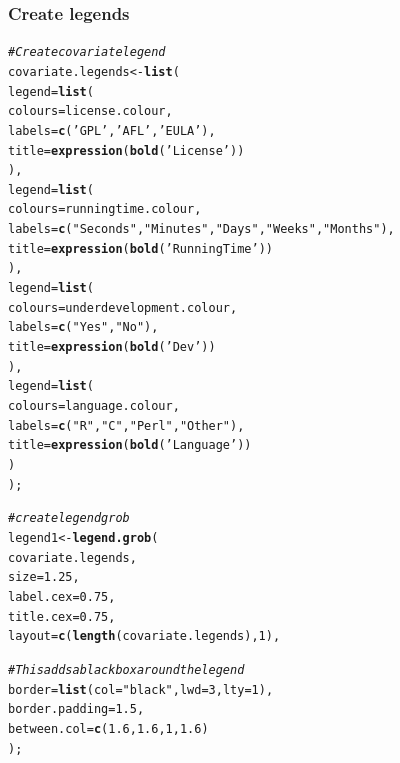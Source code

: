\documentclass[letterpaper]{article}\usepackage[]{graphicx}\usepackage[]{color}
\makeatletter
\newcommand{\hlnum}[1]{\textcolor[rgb]{0.686,0.059,0.569}{#1}}%
\newcommand{\hlstr}[1]{\textcolor[rgb]{0.192,0.494,0.8}{#1}}%
\newcommand{\hlcom}[1]{\textcolor[rgb]{0.678,0.584,0.686}{\textit{#1}}}%
\newcommand{\hlstd}[1]{\textcolor[rgb]{0.345,0.345,0.345}{#1}}%
\newcommand{\hlkwb}[1]{\textcolor[rgb]{0.69,0.353,0.396}{#1}}%
\newcommand{\hlkwc}[1]{\textcolor[rgb]{0.333,0.667,0.333}{#1}}%
\newcommand{\hlkwd}[1]{\textcolor[rgb]{0.737,0.353,0.396}{\textbf{#1}}}%
\newenvironment{kframe}{%
 \def\at@end@of@kframe{}%
 \ifinner\ifhmode%
  \def\at@end@of@kframe{\end{minipage}}%
  \begin{minipage}{\columnwidth}%
 \fi\fi%
 \def\FrameCommand##1{\hskip\@totalleftmargin \hskip-\fboxsep
 \colorbox{shadecolor}{##1}\hskip-\fboxsep
     \hskip-\linewidth \hskip-\@totalleftmargin \hskip\columnwidth}%
 \MakeFramed {\advance\hsize-\width
   \@totalleftmargin\z@ \linewidth\hsize
   \@setminipage}}%
 {\par\unskip\endMakeFramed%
 \at@end@of@kframe}
\newenvironment{knitrout}{}{} %
\makeatother
\begin{document}
\subsubsection{Create legends}
\begin{knitrout}
\color{fgcolor}\begin{kframe}
\begin{alltt}
\hlcom{# Create covariate legend}
\hlstd{covariate.legends} \hlkwb{<-} \hlkwd{list}\hlstd{(}
    \hlkwc{legend} \hlstd{=} \hlkwd{list}\hlstd{(}
        \hlkwc{colours} \hlstd{= license.colour,}
        \hlkwc{labels}  \hlstd{=} \hlkwd{c}\hlstd{(}\hlstr{'GPL'}\hlstd{,} \hlstr{'AFL'}\hlstd{,} \hlstr{'EULA'}\hlstd{),}
        \hlkwc{title}   \hlstd{=} \hlkwd{expression}\hlstd{(}\hlkwd{bold}\hlstd{(}\hlstr{'License'}\hlstd{))}
        \hlstd{),}
    \hlkwc{legend} \hlstd{=} \hlkwd{list}\hlstd{(}
        \hlkwc{colours} \hlstd{= runningtime.colour,}
        \hlkwc{labels}  \hlstd{=} \hlkwd{c}\hlstd{(}\hlstr{"Seconds"}\hlstd{,} \hlstr{"Minutes"}\hlstd{,} \hlstr{"Days"}\hlstd{,} \hlstr{"Weeks"}\hlstd{,} \hlstr{"Months"}\hlstd{),}
        \hlkwc{title}   \hlstd{=} \hlkwd{expression}\hlstd{(}\hlkwd{bold}\hlstd{(}\hlstr{'Running Time'}\hlstd{))}
        \hlstd{),}
    \hlkwc{legend} \hlstd{=} \hlkwd{list}\hlstd{(}
        \hlkwc{colours} \hlstd{= underdevelopment.colour,}
        \hlkwc{labels}  \hlstd{=} \hlkwd{c}\hlstd{(}\hlstr{"Yes"}\hlstd{,} \hlstr{"No"}\hlstd{),}
        \hlkwc{title}   \hlstd{=} \hlkwd{expression}\hlstd{(}\hlkwd{bold}\hlstd{(}\hlstr{'Dev'}\hlstd{))}
        \hlstd{),}
    \hlkwc{legend} \hlstd{=} \hlkwd{list}\hlstd{(}
        \hlkwc{colours} \hlstd{= language.colour,}
        \hlkwc{labels}  \hlstd{=} \hlkwd{c}\hlstd{(}\hlstr{"R"}\hlstd{,} \hlstr{"C"}\hlstd{,} \hlstr{"Perl"}\hlstd{,} \hlstr{"Other"}\hlstd{),}
        \hlkwc{title}   \hlstd{=} \hlkwd{expression}\hlstd{(}\hlkwd{bold}\hlstd{(}\hlstr{'Language'}\hlstd{))}
        \hlstd{)}
    \hlstd{);}

\hlcom{# create legend grob}
\hlstd{legend1} \hlkwb{<-} \hlkwd{legend.grob}\hlstd{(}
    \hlstd{covariate.legends,}
    \hlkwc{size} \hlstd{=} \hlnum{1.25}\hlstd{,}
    \hlkwc{label.cex} \hlstd{=} \hlnum{0.75}\hlstd{,}
    \hlkwc{title.cex} \hlstd{=} \hlnum{0.75}\hlstd{,}
    \hlkwc{layout} \hlstd{=} \hlkwd{c}\hlstd{(}\hlkwd{length}\hlstd{(covariate.legends),} \hlnum{1}\hlstd{),}

    \hlcom{# This adds a black box around the legend}
    \hlkwc{border} \hlstd{=} \hlkwd{list}\hlstd{(}\hlkwc{col} \hlstd{=} \hlstr{"black"}\hlstd{,} \hlkwc{lwd} \hlstd{=} \hlnum{3}\hlstd{,} \hlkwc{lty} \hlstd{=} \hlnum{1}\hlstd{),}
    \hlkwc{border.padding} \hlstd{=} \hlnum{1.5}\hlstd{,}
    \hlkwc{between.col} \hlstd{=} \hlkwd{c}\hlstd{(}\hlnum{1.6}\hlstd{,} \hlnum{1.6}\hlstd{,} \hlnum{1}\hlstd{,} \hlnum{1.6}\hlstd{)}
    \hlstd{);}



\end{alltt}
\end{kframe}
\end{knitrout}
\end{document}
